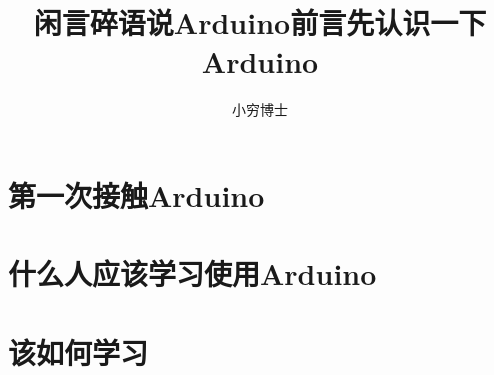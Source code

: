 \documentclass[a4paper, 11pt]{book}
\begin{document}
\title{闲言碎语说Arduino}
\author{小穷博士}
\maketitle

\title{前言}
\section{第一次接触Arduino}
\section{什么人应该学习使用Arduino}
\section{该如何学习}
\title{先认识一下Arduino}
\end{document}
